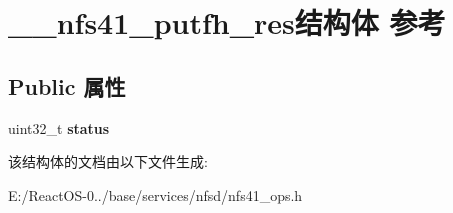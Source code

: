 \hypertarget{struct____nfs41__putfh__res}{}\section{\+\_\+\+\_\+nfs41\+\_\+putfh\+\_\+res结构体 参考}
\label{struct____nfs41__putfh__res}
\subsection*{Public 属性}
\begin{DoxyCompactItemize}
\item 
\mbox{\label{struct____nfs41__putfh__res_a1f9fcf3f53c0aaa0d8e510ee4178fe53}} 
uint32\+\_\+t {\bfseries status}
\end{DoxyCompactItemize}


该结构体的文档由以下文件生成\+:\begin{DoxyCompactItemize}
\item 
E\+:/\+React\+O\+S-\/0../base/services/nfsd/nfs41\+\_\+ops.\+h\end{DoxyCompactItemize}
